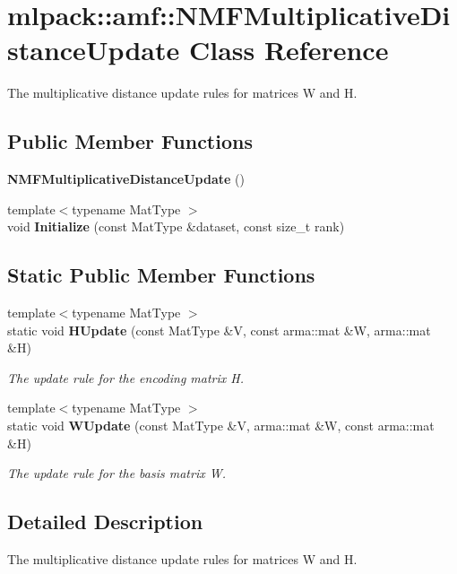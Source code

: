 \section{mlpack\-:\-:amf\-:\-:N\-M\-F\-Multiplicative\-Distance\-Update Class Reference}
\label{classmlpack_1_1amf_1_1NMFMultiplicativeDistanceUpdate}


The multiplicative distance update rules for matrices W and H.  


\subsection*{Public Member Functions}
\begin{DoxyCompactItemize}
\item 
{\bf N\-M\-F\-Multiplicative\-Distance\-Update} ()
\item 
{\footnotesize template$<$typename Mat\-Type $>$ }\\void {\bf Initialize} (const Mat\-Type \&dataset, const size\-\_\-t rank)
\end{DoxyCompactItemize}
\subsection*{Static Public Member Functions}
\begin{DoxyCompactItemize}
\item 
{\footnotesize template$<$typename Mat\-Type $>$ }\\static void {\bf H\-Update} (const Mat\-Type \&V, const arma\-::mat \&W, arma\-::mat \&H)
\begin{DoxyCompactList}\small\item\em The update rule for the encoding matrix H. \end{DoxyCompactList}\item 
{\footnotesize template$<$typename Mat\-Type $>$ }\\static void {\bf W\-Update} (const Mat\-Type \&V, arma\-::mat \&W, const arma\-::mat \&H)
\begin{DoxyCompactList}\small\item\em The update rule for the basis matrix W. \end{DoxyCompactList}\end{DoxyCompactItemize}


\subsection{Detailed Description}
The multiplicative distance update rules for matrices W and H. 

